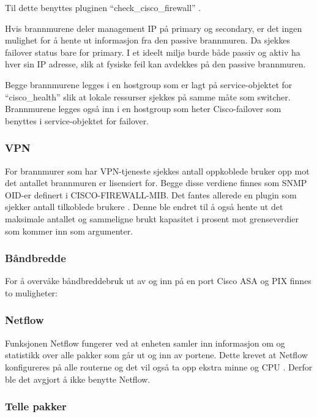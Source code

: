 Til dette benyttes pluginen “check\_cisco\_firewall” \cite{checkciscofirewall}.

Hvis brannmurene deler management IP på primary og secondary, er det ingen mulighet for å hente ut informasjon fra den passive brannmuren. Da sjekkes failover status bare for primary. I et ideelt miljø burde både passiv og aktiv ha hver sin IP adresse, slik at fysiske feil kan avdekkes på den passive brannmuren.

Begge brannmurene legges i en hostgroup som er lagt på service-objektet for “cisco\_health” slik at lokale ressurser sjekkes på samme måte som switcher. Brannmurene legges også inn i en hostgroup som heter Cisco-failover som benyttes i service-objektet for failover.

\subsubsection{VPN}

For brannmurer som har VPN-tjeneste sjekkes antall oppkoblede bruker opp mot det antallet brannmuren er lisensiert for. Begge disse verdiene finnes som SNMP OID-er definert i CISCO-FIREWALL-MIB. Det fantes allerede en plugin som sjekker antall tilkoblede brukere \cite{checkciscovpn}. Denne ble endret til å også hente ut det maksimale antallet og sammeligne brukt kapasitet i prosent mot grenseverdier som kommer inn som argumenter.

\subsubsection{Båndbredde}

For å overvåke båndbreddebruk ut av og inn på en port Cisco ASA og PIX finnes to muligheter:

\subsubsection*{Netflow}

Funksjonen Netflow \cite{ciscoiosnetflow} fungerer ved at enheten samler inn informasjon om og statistikk over alle pakker som går ut og inn av portene. Dette krevet at Netflow konfigureres på alle routerne og det vil også ta opp ekstra minne og CPU \cite{cisconetflowperf}. Derfor ble det avgjort å ikke benytte Netflow.

\subsubsection*{Telle pakker}

